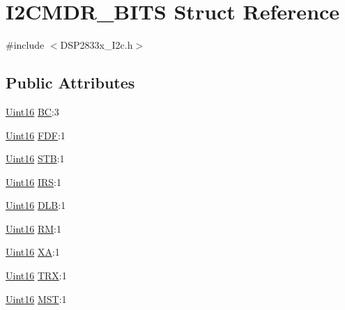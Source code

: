 \hypertarget{struct_i2_c_m_d_r___b_i_t_s}{}\section{I2\+C\+M\+D\+R\+\_\+\+B\+I\+T\+S Struct Reference}
\label{struct_i2_c_m_d_r___b_i_t_s}


{\ttfamily \#include $<$D\+S\+P2833x\+\_\+\+I2c.\+h$>$}

\subsection*{Public Attributes}
\begin{DoxyCompactItemize}
\item 
\hyperlink{_d_s_p2833x___device_8h_a59a9f6be4562c327cbfb4f7e8e18f08b}{Uint16} \hyperlink{struct_i2_c_m_d_r___b_i_t_s_a005c24db7747ea44ee2da76aa5958e4b}{B\+C}\+:3
\item 
\hyperlink{_d_s_p2833x___device_8h_a59a9f6be4562c327cbfb4f7e8e18f08b}{Uint16} \hyperlink{struct_i2_c_m_d_r___b_i_t_s_a7de6595878a572f43019b790716b05ab}{F\+D\+F}\+:1
\item 
\hyperlink{_d_s_p2833x___device_8h_a59a9f6be4562c327cbfb4f7e8e18f08b}{Uint16} \hyperlink{struct_i2_c_m_d_r___b_i_t_s_a1bc7ab9492603fb701276d3289d1cbe4}{S\+T\+B}\+:1
\item 
\hyperlink{_d_s_p2833x___device_8h_a59a9f6be4562c327cbfb4f7e8e18f08b}{Uint16} \hyperlink{struct_i2_c_m_d_r___b_i_t_s_a006d052b30adab1d4160829cdd27f4a6}{I\+R\+S}\+:1
\item 
\hyperlink{_d_s_p2833x___device_8h_a59a9f6be4562c327cbfb4f7e8e18f08b}{Uint16} \hyperlink{struct_i2_c_m_d_r___b_i_t_s_a171781eed0b9afce6216f0266f4296d9}{D\+L\+B}\+:1
\item 
\hyperlink{_d_s_p2833x___device_8h_a59a9f6be4562c327cbfb4f7e8e18f08b}{Uint16} \hyperlink{struct_i2_c_m_d_r___b_i_t_s_a3aebcf47a07e317be173f1b407dbb425}{R\+M}\+:1
\item 
\hyperlink{_d_s_p2833x___device_8h_a59a9f6be4562c327cbfb4f7e8e18f08b}{Uint16} \hyperlink{struct_i2_c_m_d_r___b_i_t_s_ac560243766d253956acde7c62ec8a12e}{X\+A}\+:1
\item 
\hyperlink{_d_s_p2833x___device_8h_a59a9f6be4562c327cbfb4f7e8e18f08b}{Uint16} \hyperlink{struct_i2_c_m_d_r___b_i_t_s_af2b3476fe6b04a481e6d5af6f620f549}{T\+R\+X}\+:1
\item 
\hyperlink{_d_s_p2833x___device_8h_a59a9f6be4562c327cbfb4f7e8e18f08b}{Uint16} \hyperlink{struct_i2_c_m_d_r___b_i_t_s_ac57f30d6f19c2fa6c0660e3900b065a8}{M\+S\+T}\+:1

\end{DoxyCompactItemize}
